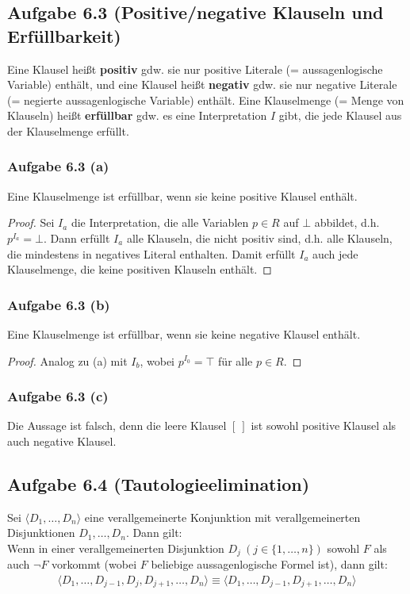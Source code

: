 \subsection{Aufgabe 6.3 (Positive/negative Klauseln und Erfüllbarkeit)}
Eine Klausel heißt \textbf{positiv} gdw. sie nur positive Literale (= aussagenlogische Variable) enthält, und eine Klausel heißt \textbf{negativ} gdw. sie nur negative Literale (= negierte aussagenlogische Variable) enthält.\nl
Eine Klauselmenge (= Menge von Klauseln) heißt \textbf{erfüllbar} gdw. es eine Interpretation $I$ gibt, die jede Klausel aus der Klauselmenge erfüllt.

\subsubsection{Aufgabe 6.3 (a)}
Eine Klauselmenge ist erfüllbar, wenn sie keine positive Klausel enthält.

\begin{proof}
	Sei $I_a$ die Interpretation, die alle Variablen $p\in R$ auf $\bot$ abbildet, d.h. $p^{I_a}=\bot$. Dann erfüllt $I_a$ alle Klauseln, die nicht positiv sind, d.h. alle Klauseln, die mindestens in negatives Literal enthalten. 
	Damit erfüllt $I_a$ auch jede Klauselmenge, die keine positiven Klauseln enthält.
\end{proof}

\subsubsection{Aufgabe 6.3 (b)}
Eine Klauselmenge ist erfüllbar, wenn sie keine negative Klausel enthält.

\begin{proof}
	Analog zu (a) mit $I_b$, wobei $p^{I_0}=\top$ für alle $p\in R$.
\end{proof}

\subsubsection{Aufgabe 6.3 (c)}
Die Aussage ist falsch, denn die leere Klausel $[~]$ ist sowohl positive Klausel als auch negative Klausel.

\subsection{Aufgabe 6.4 (Tautologieelimination)}
Sei $\langle D_1,\ldots,D_n\rangle$ eine verallgemeinerte Konjunktion mit verallgemeinerten Disjunktionen $D_1,\ldots,D_n$. 
Dann gilt:\\
Wenn in einer verallgemeinerten Disjunktion $D_j~(j\in\lbrace1,\ldots,n\rbrace)$ sowohl $F$ als auch $\neg F$ vorkommt (wobei $F$ beliebige aussagenlogische Formel ist), dann gilt:
\begin{align*}
	\big\langle D_1,\ldots,D_{j-1},D_j,D_{j+1},\ldots, D_n\big\rangle\equiv\big\langle D_1,\ldots,D_{j-1},D_{j+1},\ldots,D_n\big\rangle
\end{align*}

